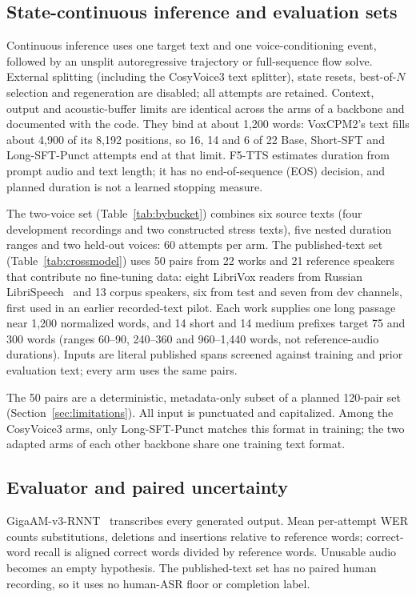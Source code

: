 \documentclass{article}
\begin{document}
\subsection{State-continuous inference and evaluation sets}

Continuous inference uses one target text and one voice-conditioning event,
followed by an unsplit autoregressive trajectory or full-sequence flow solve.
External splitting (including the CosyVoice3 text splitter), state resets,
best-of-$N$ selection and regeneration are disabled; all attempts are retained.
Context, output and acoustic-buffer limits are identical across the arms of a
backbone and documented with the code. They bind at about 1,200 words: VoxCPM2's
text fills about 4,900 of its 8,192 positions, so 16, 14 and 6 of 22 Base,
Short-SFT and Long-SFT-Punct attempts end at that limit. F5-TTS estimates
duration from prompt audio and text length; it has no end-of-sequence (EOS)
decision, and planned duration is not a learned stopping measure.

The two-voice set (Table~\ref{tab:bybucket}) combines six source texts
(four development recordings and two constructed stress texts), five nested
duration ranges and two held-out voices: 60 attempts per arm.
The published-text set (Table~\ref{tab:crossmodel}) uses 50 pairs from 22 works
and 21 reference speakers that contribute no fine-tuning data: eight LibriVox
readers from Russian LibriSpeech~\cite{openslr96ruls} and 13 corpus speakers, six
from test and seven from dev channels, first used in an earlier recorded-text pilot. Each work supplies one long passage near 1,200 normalized words, and 14 short
and 14 medium prefixes target 75 and 300 words (ranges 60--90, 240--360 and
960--1,440 words, not reference-audio durations). Inputs are literal published spans screened against training and prior
evaluation text; every arm uses the same pairs.

The 50 pairs are a deterministic, metadata-only subset of a planned 120-pair set
(Section~\ref{sec:limitations}). All input is punctuated and capitalized. Among the CosyVoice3 arms, only
Long-SFT-Punct matches this format in training; the two adapted arms of each
other backbone share one training text format.

\subsection{Evaluator and paired uncertainty}
\label{sec:evaluator}

GigaAM-v3-RNNT~\cite{kutsakov2025gigaam} transcribes every generated output.
Mean per-attempt WER counts substitutions, deletions and insertions relative to
reference words; correct-word recall is aligned correct words divided by
reference words. Unusable audio becomes an empty hypothesis.
The published-text set has no paired human recording, so it uses no human-ASR
floor or completion label.
\end{document}
